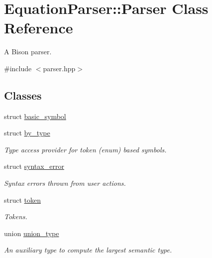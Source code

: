 \hypertarget{classEquationParser_1_1Parser}{}\section{Equation\+Parser\+:\+:Parser Class Reference}
\label{classEquationParser_1_1Parser}


A Bison parser.  




{\ttfamily \#include $<$parser.\+hpp$>$}

\subsection*{Classes}
\begin{DoxyCompactItemize}
\item 
struct \hyperlink{structEquationParser_1_1Parser_1_1basic__symbol}{basic\+\_\+symbol}
\item 
struct \hyperlink{structEquationParser_1_1Parser_1_1by__type}{by\+\_\+type}
\begin{DoxyCompactList}\small\item\em Type access provider for token (enum) based symbols. \end{DoxyCompactList}\item 
struct \hyperlink{structEquationParser_1_1Parser_1_1syntax__error}{syntax\+\_\+error}
\begin{DoxyCompactList}\small\item\em Syntax errors thrown from user actions. \end{DoxyCompactList}\item 
struct \hyperlink{structEquationParser_1_1Parser_1_1token}{token}
\begin{DoxyCompactList}\small\item\em Tokens. \end{DoxyCompactList}\item 
union \hyperlink{unionEquationParser_1_1Parser_1_1union__type}{union\+\_\+type}
\begin{DoxyCompactList}\small\item\em An auxiliary type to compute the largest semantic type. \end{DoxyCompactList}\end{DoxyCompactItemize}
